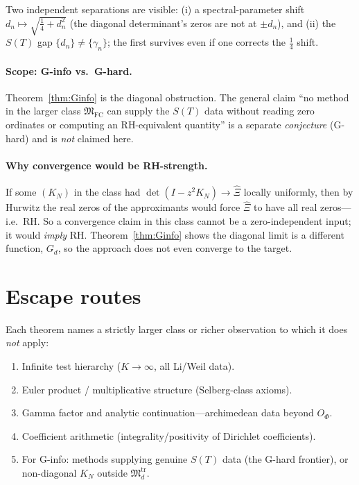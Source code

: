 \documentclass[11pt]{article}
\theoremstyle{plain}
\theoremstyle{definition}
\theoremstyle{remark}
\newcommand{\Xihat}{\widehat{\Xi}}
\newcommand{\Md}{\mathfrak{M}}
\begin{document}
Two independent separations are visible: (i) a spectral-parameter shift
$d_n\mapsto\sqrt{\tfrac14+d_n^2}$ (the diagonal determinant's zeros are not at $\pm d_n$), and
(ii) the $S(T)$ gap $\{d_n\}\neq\{\gamma_n\}$; the first survives even if one corrects the
$\tfrac14$ shift.

\paragraph{Scope: G-info vs.\ G-hard.} Theorem~\ref{thm:Ginfo} is the diagonal obstruction.
The general claim ``no method in the larger class $\Md_{\mathrm{FC}}$ can supply the $S(T)$
data without reading zero ordinates or computing an RH-equivalent quantity'' is a separate
\emph{conjecture} (G-hard) and is \emph{not} claimed here.

\paragraph{Why convergence would be RH-strength.} If some $(K_N)$ in the class had
$\det(I-z^2K_N)\to\Xihat$ locally uniformly, then by Hurwitz the real zeros of the approximants
would force $\Xihat$ to have all real zeros---i.e.\ RH. So a convergence claim in this class
cannot be a zero-independent input; it would \emph{imply} RH. Theorem~\ref{thm:Ginfo} shows the
diagonal limit is a different function, $G_d$, so the approach does not even converge to the
target.

\section{Escape routes}\label{sec:escape}
Each theorem names a strictly larger class or richer observation to which it does \emph{not}
apply:
\begin{enumerate}
  \item Infinite test hierarchy ($K\to\infty$, all Li/Weil data).
  \item Euler product / multiplicative structure (Selberg-class axioms).
  \item Gamma factor and analytic continuation---archimedean data beyond $O_\Phi$.
  \item Coefficient arithmetic (integrality/positivity of Dirichlet coefficients).
  \item For G-info: methods supplying genuine $S(T)$ data (the G-hard frontier), or
  non-diagonal $K_N$ outside $\Md_d^{\mathrm{tr}}$.
\end{enumerate}
\end{document}
